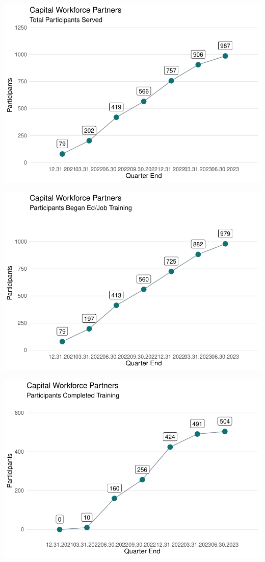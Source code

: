 \documentclass[
  landscape, table]{article}
\begin{document}
\includegraphics{ow_pdf_by_grantee_files/figure-latex/unnamed-chunk-4-1.pdf}

\includegraphics{ow_pdf_by_grantee_files/figure-latex/unnamed-chunk-5-1.pdf}

\includegraphics{ow_pdf_by_grantee_files/figure-latex/unnamed-chunk-6-1.pdf}
\end{document}
